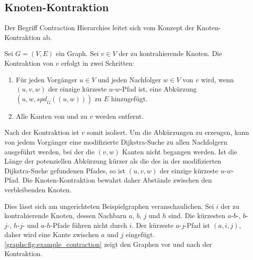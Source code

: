 \subsection{Knoten-Kontraktion}

Der Begriff Contraction Hierarchies leitet sich vom Konzept der Knoten-Kontraktion ab.

\begin{definition}
  Sei $G = (V, E)$ ein Graph. Sei $v \in V$ der zu kontrahierende Knoten. Die Kontraktion von $v$ erfolgt in zwei Schritten:

  \begin{enumerate}
    \item\label{ch:contraction:when_shortcut}
    Für jeden Vorgänger $u \in V$ und jeden Nachfolger $w \in V$ von $v$ wird, wenn $(u, v, w)$ der einzige kürzeste $u$-$w$-Pfad ist, eine Abkürzung $(u, w, {spd}_G((u, w)))$ zu $E$ hinzugefügt.

    \item
          Alle Kanten von und zu $v$ werden entfernt.
  \end{enumerate}
\end{definition}

Nach der Kontraktion ist $v$ somit isoliert.
Um die Abkürzungen zu erzeugen, kann von jedem Vorgänger eine modifizierte Dijkstra-Suche zu allen Nachfolgern ausgeführt werden, bei der die $(v, w)$ Kanten nicht begangen werden.
Ist die Länge der potenziellen Abkürzung kürzer als die des in der modifizierten Dijkstra-Suche gefundenen Pfades, so ist $(u, v, w)$ der einzige kürzeste $u$-$w$-Pfad.
Die Knoten-Kontraktion bewahrt daher Abstände zwischen den verbleibenden Knoten.

Dies lässt sich am ungerichteten Beispielgraphen veranschaulichen.
Sei $i$ der zu kontrahierende Knoten, dessen Nachbarn $a$, $b$, $j$ und $h$ sind.
Die kürzesten $a$-$b$-, $b$-$j$-, $h$-$j$- und $a$-$h$-Pfade führen nicht durch $i$.
Der kürzeste $a$-$j$-Pfad ist $(a, i, j)$, daher wird eine Kante zwischen $a$ und $j$ eingefügt.
\autoref{graphs:fig:example_contraction} zeigt den Graphen vor und nach der Kontraktion.

